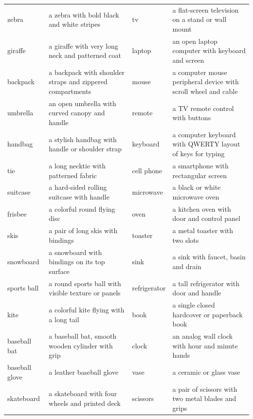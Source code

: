 \begin{table}[p]
{\begin{tabular}{@{}p{}p{}p{}p{}@{}}
zebra          & a zebra with bold black and white stripes                 & tv             & a flat-screen television on a stand or wall mount \\
giraffe        & a giraffe with very long neck and patterned coat          & laptop         & an open laptop computer with keyboard and screen \\
backpack       & a backpack with shoulder straps and zippered compartments & mouse          & a computer mouse peripheral device with scroll wheel and cable \\
umbrella       & an open umbrella with curved canopy and handle            & remote         & a TV remote control with buttons \\
handbag        & a stylish handbag with handle or shoulder strap           & keyboard       & a computer keyboard with QWERTY layout of keys for typing \\
tie            & a long necktie with patterned fabric                      & cell phone     & a smartphone with rectangular screen \\
suitcase       & a hard-sided rolling suitcase with handle                 & microwave      & a black or white microwave oven \\
frisbee        & a colorful round flying disc                              & oven           & a kitchen oven with door and control panel \\
skis           & a pair of long skis with bindings                         & toaster        & a metal toaster with two slots \\
snowboard      & a snowboard with bindings on its top surface              & sink           & a sink with faucet, basin and drain \\
sports ball    & a round sports ball with visible texture or panels        & refrigerator   & a tall refrigerator with door and handle \\
kite           & a colorful kite flying with a long tail                   & book           & a single closed hardcover or paperback book \\
baseball bat   & a baseball bat, smooth wooden cylinder with grip          & clock          & an analog wall clock with hour and minute hands \\
baseball glove & a leather baseball glove                                  & vase           & a ceramic or glass vase \\
skateboard     & a skateboard with four wheels and printed deck            & scissors       & a pair of scissors with two metal blades and grips \\

\end{tabular}}
\end{table}
